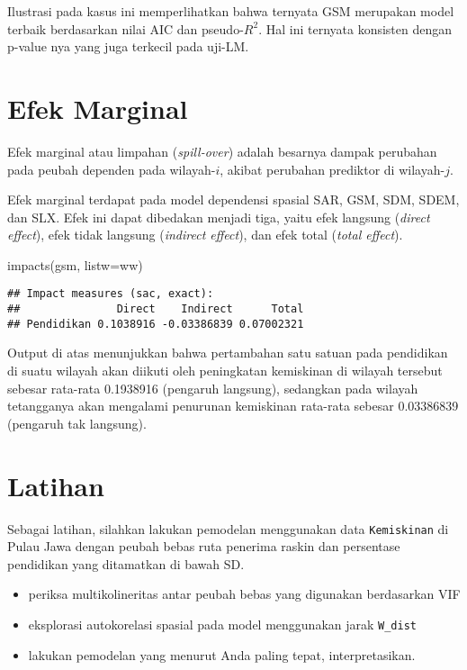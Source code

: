 \documentclass[
]{book}
\newenvironment{Shaded}{\begin{snugshade}}{\end{snugshade}}
\newcommand{\AttributeTok}[1]{\textcolor[rgb]{0.77,0.63,0.00}{#1}}
\newcommand{\FunctionTok}[1]{\textcolor[rgb]{0.00,0.00,0.00}{#1}}
\newcommand{\NormalTok}[1]{#1}
\begin{document}
Ilustrasi pada kasus ini memperlihatkan bahwa ternyata GSM merupakan model terbaik berdasarkan nilai AIC dan pseudo-\(R^2\). Hal ini ternyata konsisten dengan p-value nya yang juga terkecil pada uji-LM.

\hypertarget{efek-marginal}{%
\section{Efek Marginal}\label{efek-marginal}}

Efek marginal atau limpahan (\emph{spill-over}) adalah besarnya dampak perubahan pada peubah dependen pada wilayah-\(i\), akibat perubahan prediktor di wilayah-\(j\).

Efek marginal terdapat pada model dependensi spasial SAR, GSM, SDM, SDEM, dan SLX. Efek ini dapat dibedakan menjadi tiga, yaitu efek langsung (\emph{direct effect}), efek tidak langsung (\emph{indirect effect}), dan efek total (\emph{total effect}).

\begin{Shaded}
\begin{Highlighting}[]
\FunctionTok{impacts}\NormalTok{(gsm, }\AttributeTok{listw=}\NormalTok{ww)}
\end{Highlighting}
\end{Shaded}

\begin{verbatim}
## Impact measures (sac, exact):
##               Direct    Indirect      Total
## Pendidikan 0.1038916 -0.03386839 0.07002321
\end{verbatim}

Output di atas menunjukkan bahwa pertambahan satu satuan pada pendidikan di suatu wilayah akan diikuti oleh peningkatan kemiskinan di wilayah tersebut sebesar rata-rata 0.1938916 (pengaruh langsung), sedangkan pada wilayah tetangganya akan mengalami penurunan kemiskinan rata-rata sebesar 0.03386839 (pengaruh tak langsung).

\hypertarget{latihan}{%
\section{Latihan}\label{latihan}}

Sebagai latihan, silahkan lakukan pemodelan menggunakan data \texttt{Kemiskinan} di Pulau Jawa dengan peubah bebas ruta penerima raskin dan persentase pendidikan yang ditamatkan di bawah SD.

\begin{itemize}
\item
  periksa multikolineritas antar peubah bebas yang digunakan berdasarkan VIF
\item
  eksplorasi autokorelasi spasial pada model menggunakan jarak \texttt{W\_dist}
\item
  lakukan pemodelan yang menurut Anda paling tepat, interpretasikan.
\end{itemize}
\end{document}
